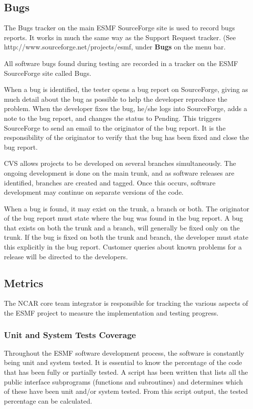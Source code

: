 \subsection{Bugs}

The Bugs tracker on the main ESMF SourceForge site is used
to record bugs reports.  It works in much the same way as
the Support Request tracker.
(See 
{http://www.sourceforge.net/projects/esmf}, under {\bf Bugs}
on the menu bar.


All software bugs found during testing are recorded
in a tracker on the ESMF SourceForge site called Bugs.

When a bug is identified, the tester opens a bug report on SourceForge, giving as much detail
about the bug as possible to help the developer reproduce the problem. When the developer
fixes the bug, he/she logs into SourceForge, adds a note to the bug report, and changes the status
to Pending. This triggers SourceForge to send an email to the originator of the bug report. It is
the responsibility of the originator to verify that the bug has been fixed and close the bug report.

CVS allows projects to be developed on several branches simultaneously. The ongoing development
is done on the main trunk, and as software releases are identified, branches are created and tagged. Once this
occurs, software development may continue on separate versions of the code. 

When a bug is found, it may exist on the trunk, a branch or both. The originator of the bug report
must state where the bug was found in the bug report.  A bug that exists on both the trunk and a 
branch, will generally be fixed only on the trunk. If the bug is fixed on both the trunk and branch, the 
developer must state this explicitly in the bug report.  Customer queries about known problems for a 
release will be directed to the developers.

\subsection{Metrics}

The NCAR core team integrator is responsible for tracking the
various aspects of the ESMF project to measure the implementation and
testing progress.
\subsubsection{Unit and System Tests Coverage}
Throughout the ESMF software development process, the software is constantly
being unit and system tested. It is essential to know the percentage of the
code that has been fully or partially tested. A script has been written that 
lists all the public interface subprograms (functions and subroutines) and 
determines which of these have been unit and/or system tested. From this script
output, the tested percentage can be calculated.
